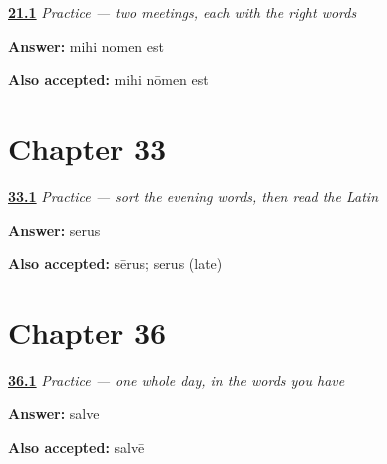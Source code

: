 \noindent\begin{minipage}[t]{\linewidth}
\raggedright
\hyperlink{review-LA-C21-practice-name-reply}{\textbf{21.1}} \emph{Practice — two meetings, each with the right words}\par
\small \textbf{Answer:} mihi nomen est\par
\footnotesize \textbf{Also accepted:} mihi nōmen est
\end{minipage}\par\medskip

\section*{Chapter 33}

\noindent\begin{minipage}[t]{\linewidth}
\raggedright
\hyperlink{review-LA-C33-practice-soir-family}{\textbf{33.1}} \emph{Practice — sort the evening words, then read the Latin}\par
\small \textbf{Answer:} serus\par
\footnotesize \textbf{Also accepted:} sērus; serus (late)
\end{minipage}\par\medskip

\section*{Chapter 36}

\noindent\begin{minipage}[t]{\linewidth}
\raggedright
\hyperlink{review-LA-C36-practice-afternoon-line}{\textbf{36.1}} \emph{Practice — one whole day, in the words you have}\par
\small \textbf{Answer:} salve\par
\footnotesize \textbf{Also accepted:} salvē
\end{minipage}\par\medskip
